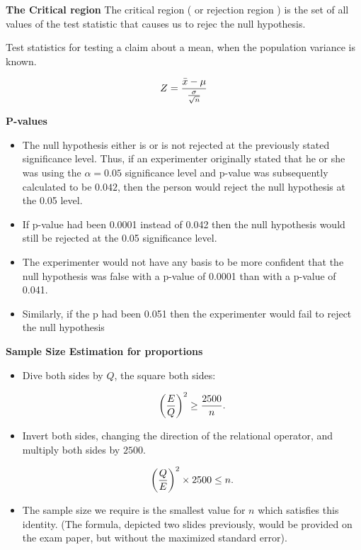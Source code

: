 \documentclass[]{report}
\begin{document}
{
\textbf{The Critical region}
The critical region ( or rejection region ) is the set of all values of the test statistic that causes us to rejec the null hypothesis.

}
{

Test statistics for testing a claim about a mean, when the population variance is known.

\[ Z = {\bar{x}  - \mu \over {\sigma \over \sqrt{n}}} \]
}






\textbf{P-values}

\begin{itemize}
\item The null hypothesis either is or is not rejected at the previously stated significance level. Thus, if an experimenter originally stated that he or she was using the $\alpha = 0.05$ significance level and p-value was subsequently calculated to be $0.042$, then the person would reject the null hypothesis at the 0.05 level. \item If p-value had been 0.0001 instead of 0.042 then the null hypothesis would still be rejected at the 0.05 significance level.  \item
The experimenter would not have any basis to be more confident that the null hypothesis was false with a p-value of 0.0001 than with a p-value of 0.041. \item Similarly, if the p had been 0.051 then the experimenter would fail to reject the null hypothesis
\end{itemize}












\textbf{Sample Size Estimation for proportions}

\begin{itemize}

\item Dive both sides by $Q$, the square both sides:

\[ \left({E\over Q}\right)^2 \geq {2500 \over n}. \]

\item Invert both sides, changing the direction of the relational operator, and multiply both sides by $2500$.

\[ \left({Q\over E}\right)^2 \times 2500 \leq n. \]

\item The sample size we require is the smallest value for $n$ which satisfies this identity. (The formula,  depicted two slides previously, would be provided on the exam paper, but without the maximized standard error).
\end{itemize}
\end{document}
